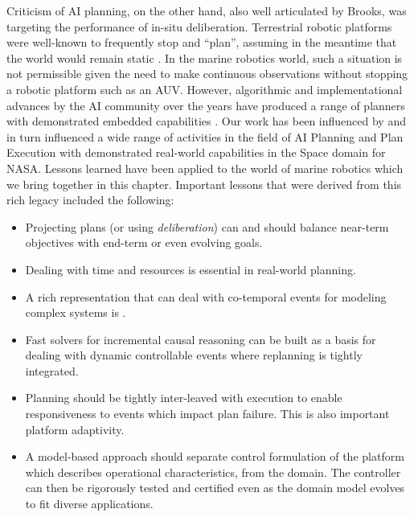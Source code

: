 Criticism of AI planning, on the other hand, also well articulated by
Brooks, was targeting the performance of in-situ
deliberation. Terrestrial robotic platforms were well-known to
frequently stop and ``plan'', assuming in the meantime that the world
would remain static \cite{shakey84}. In the marine robotics world,
such a situation is not permissible given the need to make continuous
observations without stopping a  robotic
platform such as an AUV. However, algorithmic and implementational
advances by the AI community over the years have produced a range of
planners with demonstrated embedded capabilities
\cite{simmons94,Haigh98,alami:1998p820,chien00,mus98,teichteil07}. Our
work has been influenced by and in turn influenced a wide range of
activities in the field of AI Planning and Plan Execution with
demonstrated real-world capabilities in the Space domain
\cite{mus98,rajan00,aichang04,bresina05} for NASA. Lessons learned
have been applied to the world of marine robotics which we bring
together in this chapter. Important lessons that were derived from
this rich legacy included the following:

\begin{itemize}

\item Projecting plans (or using \emph{deliberation}) can and should
  balance near-term objectives with end-term or even evolving goals.

\item Dealing with time and resources is essential in real-world
  planning.

\item A rich representation that can deal with co-temporal events for
  modeling complex systems is .

\item Fast solvers for incremental causal reasoning can be built as a
  basis for dealing with dynamic controllable events where replanning
  is tightly integrated.

\item Planning should be tightly inter-leaved with execution to enable
  responsiveness to events which impact plan failure. This is also
  important  platform adaptivity.

\item A model-based approach should separate control formulation of
  the platform which describes operational characteristics, from the
  domain. The controller can then be rigorously tested and certified
  even as the domain model evolves to fit  diverse applications.

\end{itemize}

